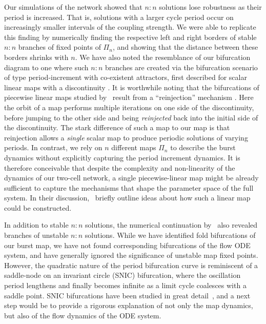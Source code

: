 Our simulations of the network showed that $n:n$ solutions lose robustness as their period is increased.
That is, solutions with a larger cycle period occur on increasingly smaller intervals of the coupling strength.
We were able to replicate this finding by numerically finding the respective left and right borders of stable $n:n$ branches of fixed points of $\Pi_n$, and showing that the distance between these borders shrinks with $n$.
We have also noted the resemblance of our bifurcation diagram to one where such $n:n$ branches are created via the bifurcation scenario of type period-increment with co-existent attractors, first described for scalar linear maps with a discontinuity \citep{avrutin2012,avrutin2011}.
It is worthwhile noting that the bifurcations of piecewise linear maps studied by~\citeauthor{avrutin2012} result from a ``reinjection'' mechanism \cite{perez1985}.
Here the orbit of a map performs multiple iterations on one side of the discontinuity, before jumping to the other side and being \textit{reinjected} back into the initial side of the discontinuity.
The stark difference of such a map to our map is that reinjection allows a \emph{single} scalar map to produce periodic solutions of varying periods.
In contrast, we rely on $n$ different maps $\Pi_n$ to describe the burst dynamics without explicitly capturing the period increment dynamics.
It is therefore conceivable that despite the complexity and non-linearity of the dynamics of our two-cell network, a single piecewise-linear map might be already sufficient to capture the mechanisms that shape the parameter space of the full system.
In their discussion,~\citet{bose2011} briefly outline ideas about how such a linear map could be constructed.

In addition to stable $n:n$ solutions, the numerical continuation by~\citet{bose2011} also revealed branches of unstable $n:n$ solutions. While we have identified fold bifurcations of our burst map, we have not found corresponding bifurcations of the flow ODE system, and have generally ignored the significance of unstable map fixed points. However, the quadratic nature of the period bifurcation curve is reminiscent of a saddle-node on an invariant circle (SNIC) bifurcation, where the oscillation period lengthens and finally becomes infinite as a limit cycle coalesces with a saddle point.
SNIC bifurcations have been studied in great detail~\cite[e.g.][]{ermentrout1986}, and a next step would be to provide a rigorous explanation of not only the map dynamics, but also of the flow dynamics of the ODE system.

